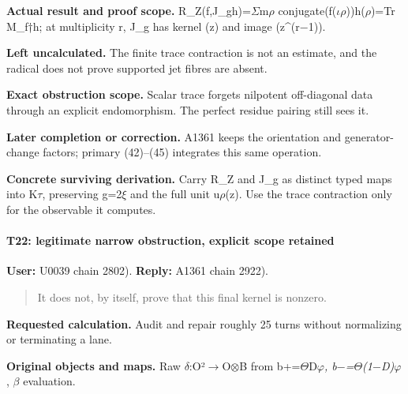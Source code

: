 \textbf{Actual result and proof scope.}
R\_Z(f,J\_gh)=\allowbreak{}\ensuremath{Σ}\allowbreak{}m\allowbreak{}\ensuremath{ρ}\allowbreak{}
conjugate(f(\allowbreak{}\ensuremath{ι}\allowbreak{}\allowbreak{}\ensuremath{ρ}\allowbreak{}))h(\allowbreak{}\ensuremath{ρ}\allowbreak{})=Tr
M\_f†h; at multiplicity r, J\_g has kernel (z) and image
(z\textasciicircum{}(r\allowbreak{}\ensuremath{−}\allowbreak{}1)).

\textbf{Left uncalculated.} The finite trace contraction is not an
estimate, and the radical does not prove supported jet fibres are
absent.

\textbf{Exact obstruction scope.} Scalar trace forgets nilpotent
off-diagonal data through an explicit endomorphism. The perfect residue
pairing still sees it.

\textbf{Later completion or correction.} A1361 keeps the orientation and
generator-change factors; primary (42)--(45) integrates this same
operation.

\textbf{Concrete surviving derivation.} Carry R\_Z and J\_g as distinct
typed maps into K\allowbreak{}\ensuremath{τ}\allowbreak{}, preserving
g=2\allowbreak{}\ensuremath{ξ}\allowbreak{} and the full unit
u\allowbreak{}\ensuremath{ρ}\allowbreak{}(z). Use the trace contraction
only for the observable it computes.

\paragraph{T22: legitimate narrow obstruction, explicit scope
retained}\label{t22-legitimate-narrow-obstruction-explicit-scope-retained}

\textbf{User:} U0039
\protect{} chain 2802).
\textbf{Reply:} A1361
\protect{} chain 2922).

\begin{quote}
It does not, by itself, prove that this final kernel is nonzero.
\end{quote}

\textbf{Requested calculation.} Audit and repair roughly 25 turns
without normalizing or terminating a lane.

\textbf{Original objects and maps.} Raw
\allowbreak{}\ensuremath{δ}\allowbreak{}:O²\allowbreak{}\ensuremath{→}\allowbreak{}O\allowbreak{}\ensuremath{⊗}\allowbreak{}B
from
b+=\allowbreak{}\ensuremath{Θ}\allowbreak{}D\allowbreak{}\ensuremath{φ}\allowbreak{}\emph{,
b\allowbreak{}\ensuremath{−}\allowbreak{}=\allowbreak{}\ensuremath{Θ}\allowbreak{}(1\allowbreak{}\ensuremath{−}\allowbreak{}D)\allowbreak{}\ensuremath{φ}\allowbreak{}},
\allowbreak{}\ensuremath{β}\allowbreak{} evaluation.

